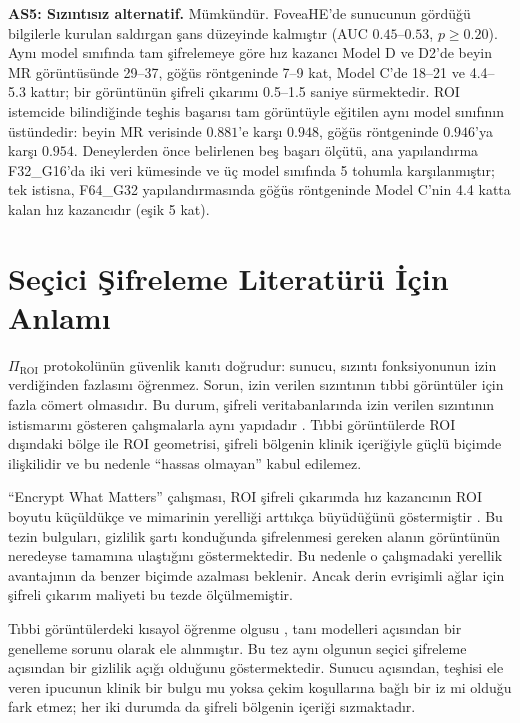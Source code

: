 \textbf{AS5: Sızıntısız alternatif.} Mümkündür. FoveaHE'de sunucunun gördüğü bilgilerle kurulan saldırgan şans düzeyinde kalmıştır (AUC $0.45$--$0.53$, $p \geq 0.20$). Aynı model sınıfında tam şifrelemeye göre hız kazancı Model D ve D2'de beyin MR görüntüsünde 29--37, göğüs röntgeninde 7--9 kat, Model C'de 18--21 ve 4.4--5.3 kattır; bir görüntünün şifreli çıkarımı 0.5--1.5 saniye sürmektedir. ROI istemcide bilindiğinde teşhis başarısı tam görüntüyle eğitilen aynı model sınıfının üstündedir: beyin MR verisinde $0.881$'e karşı $0.948$, göğüs röntgeninde $0.946$'ya karşı $0.954$. Deneylerden önce belirlenen beş başarı ölçütü, ana yapılandırma F32\_G16'da iki veri kümesinde ve üç model sınıfında 5 tohumla karşılanmıştır; tek istisna, F64\_G32 yapılandırmasında göğüs röntgeninde Model C'nin 4.4 katta kalan hız kazancıdır (eşik 5 kat).

\section{Seçici Şifreleme Literatürü İçin Anlamı}\label{sec:anlam}

$\Pi_{\mathrm{ROI}}$ protokolünün güvenlik kanıtı doğrudur: sunucu, sızıntı fonksiyonunun izin verdiğinden fazlasını öğrenmez. Sorun, izin verilen sızıntının tıbbi görüntüler için fazla cömert olmasıdır. Bu durum, şifreli veritabanlarında izin verilen sızıntının istismarını gösteren çalışmalarla aynı yapıdadır \cite{naveed2015inference,cash2015leakage}. Tıbbi görüntülerde ROI dışındaki bölge ile ROI geometrisi, şifreli bölgenin klinik içeriğiyle güçlü biçimde ilişkilidir ve bu nedenle ``hassas olmayan'' kabul edilemez.

``Encrypt What Matters'' çalışması, ROI şifreli çıkarımda hız kazancının ROI boyutu küçüldükçe ve mimarinin yerelliği arttıkça büyüdüğünü göstermiştir \cite{backour2026encrypt}. Bu tezin bulguları, gizlilik şartı konduğunda şifrelenmesi gereken alanın görüntünün neredeyse tamamına ulaştığını göstermektedir. Bu nedenle o çalışmadaki yerellik avantajının da benzer biçimde azalması beklenir. Ancak derin evrişimli ağlar için şifreli çıkarım maliyeti bu tezde ölçülmemiştir.

Tıbbi görüntülerdeki kısayol öğrenme olgusu \cite{degrave2021shortcuts,maguolo2021critic}, tanı modelleri açısından bir genelleme sorunu olarak ele alınmıştır. Bu tez aynı olgunun seçici şifreleme açısından bir gizlilik açığı olduğunu göstermektedir. Sunucu açısından, teşhisi ele veren ipucunun klinik bir bulgu mu yoksa çekim koşullarına bağlı bir iz mi olduğu fark etmez; her iki durumda da şifreli bölgenin içeriği sızmaktadır.

